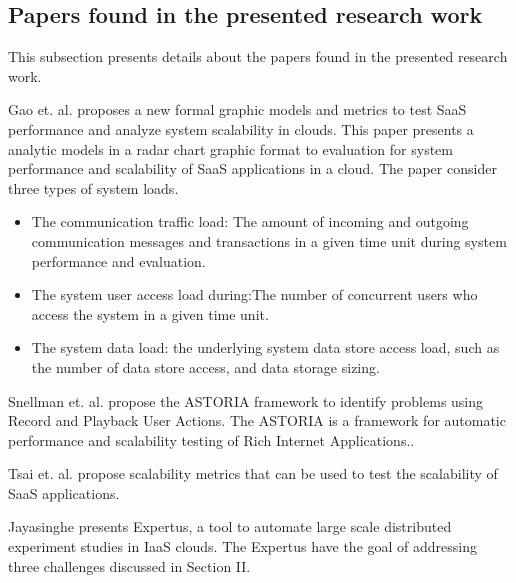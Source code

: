 \subsection{Papers found in the presented research work}

This subsection presents details about the papers found in the presented research work.

Gao et. al. proposes  a new formal graphic models and metrics to test SaaS performance and analyze system scalability in clouds. This paper presents a analytic models in a radar chart graphic format to evaluation for system performance and scalability of SaaS applications in a cloud.  The paper consider three types of system loads\cite{Gao2011}.

\begin{itemize}
\item The communication traffic load:  The amount of incoming and outgoing communication messages and transactions in a given time unit during system performance and evaluation.
\item The system user access load during:The number of concurrent users who access the system in a given time unit.
\item The system data load: the underlying
system data store access load, such as the number of data
store access, and data storage sizing.
\end{itemize}


Snellman et. al. propose the ASTORIA framework to identify problems using Record and Playback User Actions. The ASTORIA is a framework for automatic performance and scalability testing of Rich Internet Applications.\cite{Snellman2011}.

Tsai et. al. propose scalability metrics that can be used to test the scalability of SaaS applications.

Jayasinghe presents Expertus, a tool to automate large scale distributed experiment studies in IaaS clouds. The Expertus have the goal of addressing three challenges discussed in Section II.